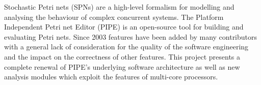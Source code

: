 Stochastic Petri nets (SPNs) are a high-level formalism for modelling and analysing the behaviour of complex concurrent systems.
The Platform Independent Petri net Editor (PIPE) is an open-source tool for building and evaluating Petri nets. Since 2003 features have been added by many contributors with a general lack of consideration for the quality of the software engineering and the impact on the correctness of other features. This project presents a complete renewal of PIPE's underlying software architecture as well as new analysis modules which exploit the features of multi-core processors. 